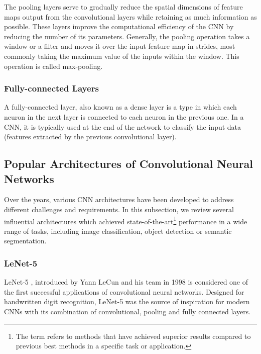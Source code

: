 The pooling layers serve to gradually reduce the spatial dimensions of feature
maps output from the convolutional layers while retaining as much information as
possible. These layers improve the computational efficiency of the CNN by
reducing the number of its parameters. Generally, the pooling operation takes a
window or a filter and moves it over the input feature map in strides, most
commonly taking the maximum value of the inputs within the window. This
operation is called max-pooling. \cite{OShea2015}


\subsubsection{Fully-connected Layers}

A fully-connected layer, also known as a dense layer is a type in which each
neuron in the next layer is connected to each neuron in the previous one. In a
CNN, it is typically used at the end of the network to classify the input data
(features extracted by the previous convolutional layer). \cite{OShea2015}


\subsection{Popular Architectures of Convolutional Neural Networks}


Over the years, various CNN architectures have been developed to address
different challenges and requirements. In this subsection, we review several
influential architectures which achieved state-of-the-art\footnote{The term
 refers to methods that have achieved superior results
compared to previous best methods in a specific task or application.}
performance in a wide range of tasks, including image classification, object
detection or semantic segmentation.


\subsubsection{LeNet-5}

LeNet-5 \cite{Lecun1998}, introduced by Yann LeCun and his team in 1998 is
considered one of the first successful applications of convolutional neural
networks. Designed for handwritten digit recognition, LeNet-5 was the source of
inspiration for modern CNNs with its combination of convolutional, pooling and
fully connected layers.


